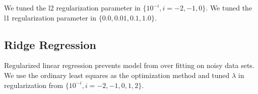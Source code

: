 We tuned the l2 regularization parameter in $\{10^{-i}, i = -2,-1,0\}$.
We tuned the l1 regularization parameter in $\{0.0, 0.01, 0.1, 1.0\}$.

\subsection{Ridge Regression}
Regularized linear regression prevents model from over fitting on noisy data sets\cite{mohri2012foundations,tibshirani1996regression}.
We use the ordinary least squares as the optimization method and tuned $\lambda$ in regularization from $\{10^{-i}, i = -2,-1,0,1,2\}.$